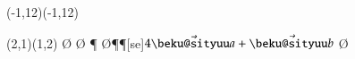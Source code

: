 \documentclass{jarticle}
\begin{document}
\begin{zahyou}[ul=8mm](-1,12)(-1,12)
  \zahyouMemori[g]%
  \def\E{(2,1)}%
  \def\F{(1,2)}%
  \begin{azahyou}\E\F
    \azArrowLine\O\A\azPut{}
    \azArrowLine\O\B\azPut{}
    \azKuromaru\P
    \azArrowLine\O\P\azPut\P[se]{$4\beku a+\beku b$}
    \azArrowLine\O\Q\azPut{}
  \end{azahyou}
\end{zahyou}
\end{document}
